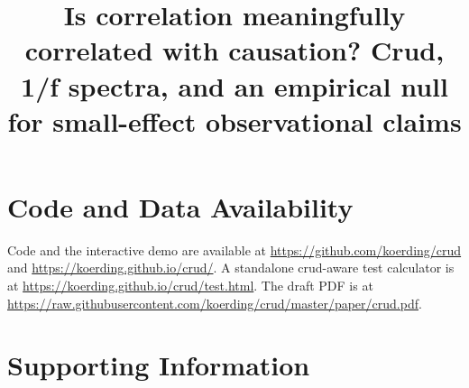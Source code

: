 \documentclass[11pt]{article}
\title{Is correlation meaningfully correlated with causation? Crud, 1/f spectra, and an empirical null for small-effect observational claims}
\author{}
\date{}
\newcommand{\1}{\mathbf{1}}
\begin{document}
\maketitle









\section*{Code and Data Availability}
Code and the interactive demo are available at \url{https://github.com/koerding/crud} and \url{https://koerding.github.io/crud/}. A standalone crud-aware test calculator is at \url{https://koerding.github.io/crud/test.html}. The draft PDF is at \url{https://raw.githubusercontent.com/koerding/crud/master/paper/crud.pdf}.

\appendix
{}
\section*{Supporting Information}










\end{document}
